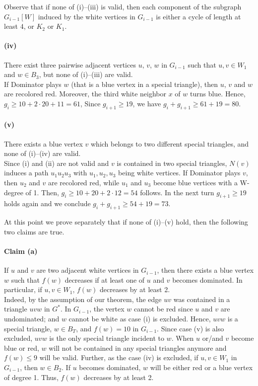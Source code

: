 \documentclass[12pt]{article}
\begin{document}
\medskip

Observe that if none of (i)--(iii) is valid, then each component of the subgraph $G_{i-1} [W]$ induced by the white vertices in $G_{i-1}$ is either a cycle of length at least $4$, or $K_2$ or $K_1$. 

\paragraph{(iv)} There exist three pairwise adjacent vertices $u$, $v$, $w$ in $G_{i-1}$ such that $u,v \in W_1$ and $w\in B_3$, but none of (i)--(iii) are valid.\\
If Dominator plays $w$ (that is a blue vertex in a special triangle), then $u$, $v$ and $w$ are recolored red. Moreover, the third white neighbor $x$ of $w$ turns blue. Hence, 
$g_i \ge 10 + 2 \cdot 20+ 11 =61$, Since $g_{i+1}\ge 19$, we have $g_i + g_{i+1}\ge 61+19=80$.

\paragraph{(v)} There exists a blue vertex $v$ which belongs to two different special triangles, and none of (i)--(iv) are valid.\\
Since (i) and (ii) are not valid and $v$ is contained in two special triangles, $N(v)$ induces a path $u_1u_2u_3$ with $u_1,u_2,u_3$ being white vertices. If Dominator plays $v$, then $u_2$ and $v$ are recolored red, while $u_1$ and $u_3$  become blue vertices with a W-degree of 1. Then, $g_i \ge 10 + 20 + 2\cdot 12 =54$ follows. In the next turn $g_{i+1}\ge 19$ holds again and we conclude $g_i + g_{i+1}\ge 54+19=73$.
\medskip



At this point we prove separately that if none of (i)--(v) hold, then the following two claims are true.
\paragraph{Claim (a)} If $u$ and $v$ are two adjacent white vertices in $G_{i-1}$, then there exists a blue vertex $w$ such that $f(w)$ decreases if at least one of $u$ and $v$ becomes dominated. In particular, if $u,v\in W_1$, $f(w)$ decreases by at least 2.\\
Indeed, by the assumption of our theorem, the edge $uv$ was contained in a triangle $uvw$ in $G^*$. In $G_{i-1}$, the vertex $w$ cannot be red since $u$ and $v$ are undominated; and $w$ cannot be white as case (i) is excluded. Hence, $uvw$ is a special triangle, $w\in B_T$, and $f(w)= 10$ in $G_{i-1}$. Since case (v) is also excluded, $uvw$ is the only special triangle incident to $w$. When  $u$ or/and $v$ become blue or red, $w$ will not be contained in any special triangles anymore and $f(w) \le 9$ will be valid. 
Further, as the case (iv) is excluded,  if $u,v \in W_1$ in $G_{i-1}$, then $w\in B_2$. If $u$  becomes dominated, $w$ will be either red or a blue vertex of degree 1. Thus, $f(w)$ decreases by at least 2.
\end{document}
